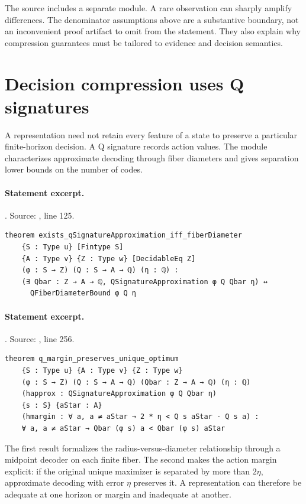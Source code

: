 \documentclass[11pt]{article}
\begin{document}
The source includes a separate  module. A rare
observation can sharply amplify differences. The denominator assumptions above
are a substantive boundary, not an inconvenient proof artifact to omit from
the statement. They also explain why compression guarantees must be tailored
to evidence and decision semantics.

\section{Decision compression uses Q signatures}
A representation need not retain every feature of a state to preserve a
particular finite-horizon decision. A Q signature records action values. The
 module characterizes approximate decoding through fiber
diameters and gives separation lower bounds on the number of codes.

\paragraph{Statement excerpt.}. Source: , line 125.
\begin{lstlisting}[style=AVOCSource]
theorem exists_qSignatureApproximation_iff_fiberDiameter
    {S : Type u} [Fintype S]
    {A : Type v} {Z : Type w} [DecidableEq Z]
    (φ : S → Z) (Q : S → A → ℚ) (η : ℚ) :
    (∃ Qbar : Z → A → ℚ, QSignatureApproximation φ Q Qbar η) ↔
      QFiberDiameterBound φ Q η
\end{lstlisting}

\paragraph{Statement excerpt.}. Source: , line 256.
\begin{lstlisting}[style=AVOCSource]
theorem q_margin_preserves_unique_optimum
    {S : Type u} {A : Type v} {Z : Type w}
    (φ : S → Z) (Q : S → A → ℚ) (Qbar : Z → A → ℚ) (η : ℚ)
    (happrox : QSignatureApproximation φ Q Qbar η)
    {s : S} {aStar : A}
    (hmargin : ∀ a, a ≠ aStar → 2 * η < Q s aStar - Q s a) :
    ∀ a, a ≠ aStar → Qbar (φ s) a < Qbar (φ s) aStar
\end{lstlisting}


The first result formalizes the radius-versus-diameter relationship through a
midpoint decoder on each finite fiber. The second makes the action margin
explicit: if the original unique maximizer is separated by more than
$2\eta$, approximate decoding with error $\eta$ preserves it. A representation can
therefore be adequate at one horizon or margin and inadequate at another.
\end{document}
